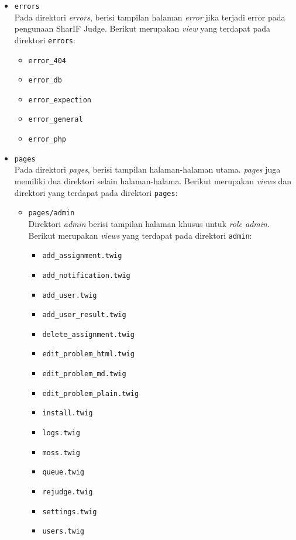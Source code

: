 \begin{itemize}
	\item \verb|errors| \\
	      Pada direktori \textit{errors}, berisi tampilan halaman \textit{error} jika terjadi error pada pengunaan SharIF Judge. Berikut merupakan \textit{view} yang terdapat pada direktori \verb|errors|:

	      \begin{itemize}
		      \item \verb|error_404|
		      \item \verb|error_db|
		      \item \verb|error_expection|
		      \item \verb|error_general|
		      \item \verb|error_php|
	      \end{itemize}

	\item \verb|pages| \\
	      Pada direktori \textit{pages}, berisi tampilan halaman-halaman utama. \textit{pages} juga memiliki dua direktori selain halaman-halama. Berikut merupakan \textit{views} dan direktori yang terdapat pada direktori \verb|pages|:

	      \begin{itemize}
		      \item \verb|pages/admin| \\
		            Direktori \textit{admin} berisi tampilan halaman khusus untuk \textit{role admin}. Berikut merupakan \textit{views} yang terdapat pada direktori \verb|admin|:

		            \begin{itemize}
			            \item \verb|add_assignment.twig|
			            \item \verb|add_notification.twig|
			            \item \verb|add_user.twig|
			            \item \verb|add_user_result.twig|
			            \item \verb|delete_assignment.twig|
			            \item \verb|edit_problem_html.twig|
			            \item \verb|edit_problem_md.twig|
			            \item \verb|edit_problem_plain.twig|
			            \item \verb|install.twig|
			            \item \verb|logs.twig|
			            \item \verb|moss.twig|
			            \item \verb|queue.twig|
			            \item \verb|rejudge.twig|
			            \item \verb|settings.twig|
			            \item \verb|users.twig|
		            \end{itemize}


\end{itemize}
\end{itemize}
